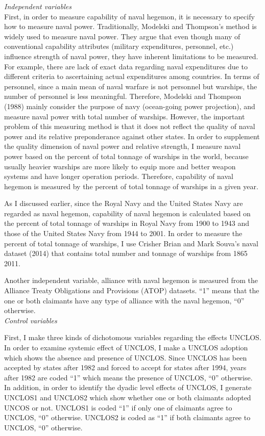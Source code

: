 \documentclass{article}
\begin{document}
\emph{Independent variables} \\
   First, in order to measure capability of naval hegemon, it is necessary to specify how to measure naval power. Traditionally, Modelski and Thompson’s method is widely used to measure naval power. They argue that even though many of conventional capability attributes (military expenditures, personnel, etc.) influence strength of naval power, they have inherent limitations to be measured. For example, there are lack of exact data regarding naval expenditures due to different criteria to ascertaining actual expenditures among countries. In terms of personnel, since a main mean of naval warfare is not personnel but warships, the number of personnel is less meaningful. Therefore, Modelski and Thompson (1988) mainly consider the purpose of navy (ocean-going power projection), and measure naval power with total number of warships. However, the important problem of this measuring method is that it does not reflect the quality of naval power and its relative preponderance against other states. In order to supplement the quality dimension of naval power and relative strength, I measure naval power based on the percent of total tonnage of warships in the world, because usually heavier warships are more likely to equip more and better weapon systems and have longer operation periods. Therefore, capability of naval hegemon is measured by the percent of total tonnage of warships in a given year. 
   
   As I discussed earlier, since the Royal Navy and the United States Navy are regarded as naval hegemon, capability of naval hegemon is calculated based on the percent of total tonnage of warships in Royal Navy from 1900 to 1943 and those of the United States Navy from 1944 to 2001. In order to measure the percent of total tonnage of warships, I use Crisher Brian and Mark Souva’s naval dataset (2014) that contains total number and tonnage of warships from 1865 ~ 2011. 

Another independent variable, alliance with naval hegemon is measured from the Alliance Treaty Obligations and Provisions (ATOP) datasets. “1” means that the one or both claimants have any type of alliance with the naval hegemon, “0” otherwise. 
\\

\emph{Control variables}

First, I make three kinds of dichotomous variables regarding the effects UNCLOS. In order to examine systemic effect of UNCLOS, I make a UNCLOS adoption which shows the absence and presence of UNCLOS. Since UNCLOS has been accepted by states after 1982 and forced to accept for states after 1994, years after 1982 are coded “1” which means the presence of UNCLOS, “0” otherwise. In addition, in order to identify the dyadic level effects of UNCLOS, I generate UNCLOS1 and UNCLOS2 which show whether one or both claimants adopted UNCOS or not. UNCLOS1 is coded “1” if only one of claimants agree to UNCLOS, “0” otherwise. UNCLOS2 is coded as “1” if both claimants agree to UNCLOS, “0” otherwise. 
\end{document}
